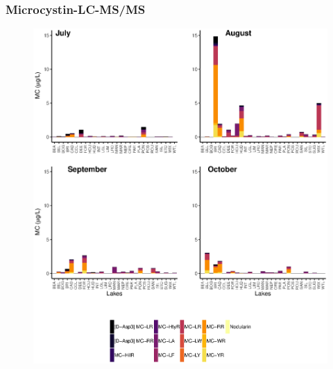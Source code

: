 \begin{frame}
	\frametitle{Microcystin-LC-MS/MS}


	\begin{figure}
		\includegraphics[width=\textwidth,height=0.99\textheight]{1month.eps}
	\end{figure}

\end{frame}



